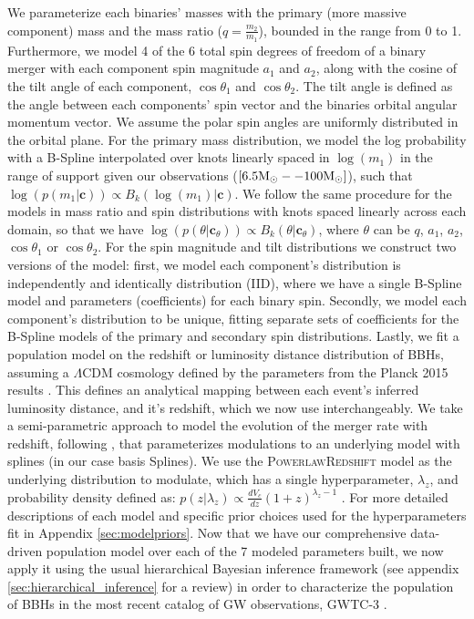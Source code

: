 We parameterize each binaries' masses with the primary (more massive component) mass 
and the mass ratio ($q=\frac{m_2}{m_1}$), bounded in the range from 0 to 1. Furthermore, we model 4 of the 6 total 
spin degrees of freedom of a binary merger with each component spin magnitude $a_1$ and $a_2$, along with the cosine of the tilt angle of each component, 
$\cos{\theta_1}$ and $\cos{\theta_2}$. The tilt angle is defined as the angle between each components' spin vector and the binaries orbital angular momentum vector. 
We assume the polar spin angles are uniformly distributed in the orbital plane. For the primary mass distribution, we model the log probability with a B-Spline interpolated over 
knots linearly spaced in $\log(m_1)$ in the range of support given our observations ($[6.5{\rm M}_\odot -- 100{\rm M}_\odot]$), such that $\log(p(m_1 | \bm{c})) \propto B_{k}(\log(m_1) | \bm{c})$. 
We follow the same procedure for the models in mass ratio and spin distributions with knots spaced linearly across each domain, so that we have $\log(p(\theta | \bm{c}_\theta)) \propto B_{k}(\theta | \bm{c}_\theta)$, 
where $\theta$ can be $q$, $a_1$, $a_2$, $\cos{\theta_1}$ or $\cos{\theta_2}$. For the spin magnitude and tilt distributions we construct two versions of the model: first, we model  
each component's distribution is independently and identically distribution (IID), where we have a single B-Spline model and parameters (coefficients) for each binary spin. 
Secondly, we model each component's distribution to be unique, fitting separate sets of coefficients for the B-Spline models of the primary and secondary spin distributions. 
Lastly, we fit a population model on the redshift or luminosity distance distribution of BBHs, assuming a $\Lambda\mathrm{CDM}$ cosmology defined by the parameters 
from the Planck 2015 results \citep{Planck2015}. This defines an analytical mapping between each event's inferred luminosity distance, and it's redshift, which we now use interchangeably. 
We take a semi-parametric approach to model the evolution of the merger rate with redshift, following \citet{Edelman_2022ApJ}, that parameterizes modulations to an underlying model 
with splines (in our case basis Splines). We use the \textsc{PowerlawRedshift} model as the underlying distribution to modulate, which has a single hyperparameter, $\lambda_z$, and 
probability density defined as: $p(z|\lambda_z)\propto \frac{dV_c}{dz}(1+z)^{\lambda_z-1}$ \citep{Fishbach_2018redshift}. For more detailed descriptions of each model and 
specific prior choices used for the hyperparameters fit in Appendix \ref{sec:modelpriors}. Now that we have our comprehensive data-driven population model over 
each of the 7 modeled parameters built, we now apply it using the usual hierarchical Bayesian inference framework (see appendix \ref{sec:hierarchical_inference} for a review) in order to characterize the population of 
BBHs in the most recent catalog of GW observations, GWTC-3 \citep{GWTC3,o3b_astro_dist}. 
